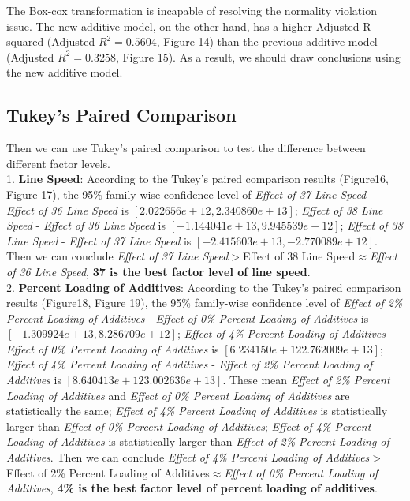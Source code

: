 \documentclass[11pt,a4paper]{article}
\begin{document}
The Box-cox transformation is incapable of resolving the normality violation issue. The new additive model, on the other hand, has a higher Adjusted R-squared (Adjusted $R^2=0.5604$, Figure 14) than the previous additive model (Adjusted $R^2=0.3258$, Figure 15). As a result, we should draw conclusions using the new additive model.


\subsection{Tukey’s Paired Comparison}
Then we can use Tukey’s paired comparison to test the difference between different factor levels.\\
1. \textbf{Line Speed}: According to the Tukey’s paired comparison results (Figure16, Figure 17), the 95\% family-wise confidence level of \textit{Effect of 37 Line Speed} - \textit{Effect of 36 Line Speed} is $[2.022656e+12,2.340860e+13]$; \textit{Effect of 38 Line Speed} - \textit{Effect of 36 Line Speed} is $[-1.144041e+13 ,9.945539e+12]$; \textit{Effect of 38 Line Speed} - \textit{Effect of 37 Line Speed} is $[-2.415603e+13, -2.770089e+12]$. Then we can conclude \textit{Effect of 37 Line Speed}$>${Effect of 38 Line Speed}$\approx$\textit{Effect of 36 Line Speed}, \textbf{37 is the best factor level of line speed}.\\
2. \textbf{Percent Loading of Additives}: According to the Tukey’s paired comparison results (Figure18, Figure 19), the 95\% family-wise confidence level of \textit{Effect of 2\% Percent Loading of Additives} - \textit{Effect of 0\% Percent Loading of Additives} is $[-1.309924e+13, 8.286709e+12]$; \textit{Effect of 4\% Percent Loading of Additives} - \textit{Effect of 0\% Percent Loading of Additives} is $[6.234150e+12 2.762009e+13]$; \textit{Effect of 4\% Percent Loading of Additives} - \textit{Effect of 2\% Percent Loading of Additives} is $[8.640413e+12 3.002636e+13]$. These mean \textit{Effect of 2\% Percent Loading of Additives} and \textit{Effect of 0\% Percent Loading of Additives} are statistically the same; \textit{Effect of 4\% Percent Loading of Additives}  is statistically larger than \textit{Effect of 0\% Percent Loading of Additives}; \textit{Effect of 4\% Percent Loading of Additives} is statistically larger than \textit{Effect of 2\% Percent Loading of Additives}. Then we can conclude \textit{Effect of 4\% Percent Loading of Additives}$>${Effect of 2\% Percent Loading of Additives}$\approx$\textit{Effect of 0\% Percent Loading of Additives}, \textbf{4\% is the best factor level of percent loading of additives}.\\
\end{document}
